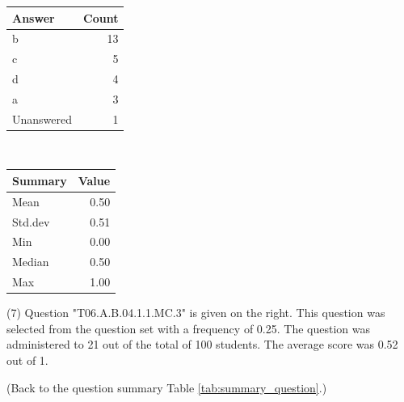 \documentclass[12pt,nohyper]{tufte-handout}\usepackage[]{graphicx}\usepackage[]{color}
\begin{document}
\begin{center}%
\begin{tabular}{lr}
  \hline
Answer & Count \\ 
  \hline
b &  13 \\ 
  c &   5 \\ 
  d &   4 \\ 
  a &   3 \\ 
  Unanswered &   1 \\ 
   \hline
\end{tabular}
~~~~~~~~%
\begin{tabular}{lr}
  \hline
Summary & Value \\ 
  \hline
Mean & 0.50 \\ 
  Std.dev & 0.51 \\ 
  Min & 0.00 \\ 
  Median & 0.50 \\ 
  Max & 1.00 \\ 
   \hline
\end{tabular}
\end{center}\newpage{} (7) Question "T06.A.B.04.1.1.MC.3" is given on the right. This question was selected from the question set with a frequency of 0.25. The question was administered to 21 out of the total of 100 students. The average score was 0.52 out of 1.

 (Back to the question summary Table \ref{tab:summary_question}.)
\end{document}
